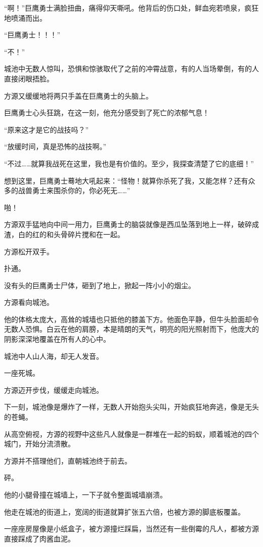 \begin{this_body}
“啊！”巨鹰勇士满脸扭曲，痛得仰天嘶吼。他背后的伤口处，鲜血宛若喷泉，疯狂地喷涌而出。

“巨鹰勇士！！！”

“不！”

城池中无数人惊叫，恐惧和惊骇取代了之前的冲霄战意，有的人当场晕倒，有的人直接闭眼捂脸。

方源又缓缓地将两只手盖在巨鹰勇士的头脑上。

巨鹰勇士心头狂跳，在这一刻，他充分感受到了死亡的浓郁气息！

“原来这才是它的战技吗？”

“放缓时间，真是恐怖的战技啊。”

“不过……就算我战死在这里，我也是有价值的。至少，我探查清楚了它的底细！”

想到这里，巨鹰勇士蓦地大吼起来：“怪物！就算你杀死了我，又能怎样？还有众多的战兽勇士来围杀你的，你必死无……”

啪！

方源双手猛地向中间一用力，巨鹰勇士的脑袋就像是西瓜坠落到地上一样，破碎成渣，白的红的和头骨碎片搅和在一起。

方源松开双手。

扑通。

没有头的巨鹰勇士尸体，砸到了地上，掀起一阵小小的烟尘。

方源看向城池。

他的体格太庞大，高耸的城墙也只抵他的膝盖下方。他面色平静，但牛头脸面却令无数人恐惧。白云在他的肩膀，本是晴朗的天气，明亮的阳光照射而下，他庞大的阴影深深地覆盖在所有人的心中。

城池中人山人海，却无人发音。

一座死城。

方源迈开步伐，缓缓走向城池。

下一刻，城池像是爆炸了一样，无数人开始抱头尖叫，开始疯狂地奔逃，像是无头的苍蝇。

从高空俯视，方源的视野中这些凡人就像是一群堆在一起的蚂蚁，顺着城池的四个城门，开始分流溃散。

方源并不搭理他们，直朝城池终于前去。

砰。

他的小腿骨撞在城墙上，一下子就令整面城墙崩溃。

他走在城池的街道上，宽阔的街道就算扩张五六倍，也被方源的脚底板覆盖。

一座座房屋像是小纸盒子，被方源撞烂踩扁，当然还有一些倒霉的凡人，都被方源直接踩成了肉酱血泥。

\end{this_body}

